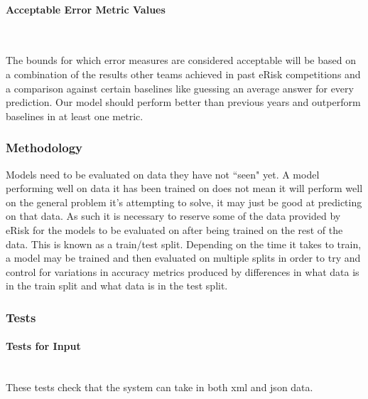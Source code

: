 \documentclass[12pt, titlepage]{article}
\newcommand{\myparagraph}[1]{\paragraph{#1}\mbox{}\\}
\begin{document}
\myparagraph{Acceptable Error Metric Values} \label{bounds}

The bounds for which error measures are considered acceptable will be based on a combination of the results other teams achieved in past eRisk competitions and a comparison against certain baselines like guessing an average answer for every prediction. Our model should perform better than previous years and outperform baselines in at least one metric.

\subsubsection{Methodology} \label{splits}

Models need to be evaluated on data they have not ``seen" yet. A model performing well on data it has been trained on does not mean it will perform well on the general problem it's attempting to solve, it may just be good at predicting on that data. As such it is necessary to reserve some of the data provided by eRisk for the models to be evaluated on after being trained on the rest of the data. This is known as a train/test split. Depending on the time it takes to train, a model may be trained and then evaluated on multiple splits in order to try and control for variations in accuracy metrics produced by differences in what data is in the train split and what data is in the test split.

\subsubsection{Tests}

\myparagraph{Tests for Input}

These tests check that the system can take in both xml and json data.
\end{document}
